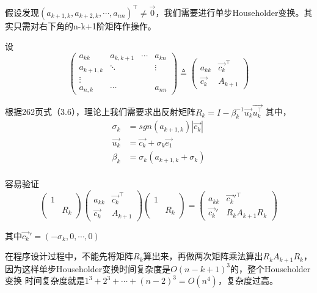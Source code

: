 \documentclass[10pt, a4paper]{article}
\begin{document}
      假设发现$(a_{k+1,k},a_{k+2,k},\cdots,a_{nn})^\top \neq \vec{0}$，我们需要进行单步Householder变换。其实只需对右下角的n-k+1阶矩阵作操作。

      设
      \[
         \begin{pmatrix}
             a_{kk}&a_{k,k+1}&\cdots& a_{kn}\\
             a_{k+1,k}&\ddots& & \vdots\\
             \vdots& & &\\
             a_{n,k}&\cdots & & a_{nn}
         \end{pmatrix} 
         \triangleq 
         \begin{pmatrix}
             a_{kk}&\vec{c_k}^\top\\
             \vec{c_k}&A_{k+1}
         \end{pmatrix}
      \]

      根据\cite{ref1}262页式（3.6），理论上我们需要求出反射矩阵$R_k=I-\beta_k^{-1}\vec{u_k}\vec{u_k^\top}$
      其中，
      \begin{align}
          \sigma_k&=sgn(a_{k+1,k})|\vec{c_k}|\\
          \vec{u_k}&=\vec{c_k}+\sigma_k\vec{e_1}\\
          \beta_k&=\sigma_k(a_{k+1,k}+\sigma_k)\\
      \end{align}

      容易验证
      \[
       \begin{pmatrix}
           1&\\
            &R_k
       \end{pmatrix}
       \begin{pmatrix}
           a_{kk}&\vec{c_k}^\top\\
           \vec{c_k}&A_{k+1}
       \end{pmatrix}
       \begin{pmatrix}
        1&\\
         &R_k
    \end{pmatrix}=
    \begin{pmatrix}
        a_{kk}&\vec{c_k}'^\top\\
        \vec{c_k}'&R_kA_{k+1}R_k
    \end{pmatrix}
      \]

      其中$\vec{c_k}'=(-\sigma_k,0,\cdots,0)$

    在程序设计过程中，不能先将矩阵$R_k$算出来，再做两次矩阵乘法算出$R_kA_{k+1}R_k$，因为这样单步Householder变换时间复杂度是$O(n-k+1)^3$的，整个Householder变换
    时间复杂度就是$1^3+2^3+\cdots+(n-2)^3=O(n^4)$，复杂度过高。
\end{document}

